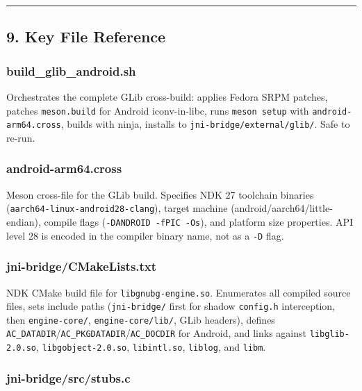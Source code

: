 \documentclass[11pt,a4paper]{article}
\begin{document}
\begin{center}\rule{0.5\linewidth}{0.5pt}\end{center}

\subsection{9. Key File Reference}\label{key-file-reference}

\subsubsection{build\_glib\_android.sh}\label{build_glib_android.sh}

Orchestrates the complete GLib cross-build: applies Fedora SRPM patches,
patches \texttt{meson.build} for Android iconv-in-libc, runs
\texttt{meson\ setup} with \texttt{android-arm64.cross}, builds with
ninja, installs to \texttt{jni-bridge/external/glib/}. Safe to re-run.

\subsubsection{android-arm64.cross}\label{android-arm64.cross}

Meson cross-file for the GLib build. Specifies NDK 27 toolchain binaries
(\texttt{aarch64-linux-android28-clang}), target machine
(android/aarch64/little-endian), compile flags
(\texttt{-DANDROID\ -fPIC\ -Os}), and platform size properties. API
level 28 is encoded in the compiler binary name, not as a \texttt{-D}
flag.

\subsubsection{jni-bridge/CMakeLists.txt}\label{jni-bridgecmakelists.txt}

NDK CMake build file for \texttt{libgnubg-engine.so}. Enumerates all
compiled source files, sets include paths (\texttt{jni-bridge/} first
for shadow \texttt{config.h} interception, then \texttt{engine-core/},
\texttt{engine-core/lib/}, GLib headers), defines
\texttt{AC\_DATADIR}/\texttt{AC\_PKGDATADIR}/\texttt{AC\_DOCDIR} for
Android, and links against \texttt{libglib-2.0.so},
\texttt{libgobject-2.0.so}, \texttt{libintl.so}, \texttt{liblog}, and
\texttt{libm}.

\subsubsection{jni-bridge/src/stubs.c}\label{jni-bridgesrcstubs.c}
\end{document}
